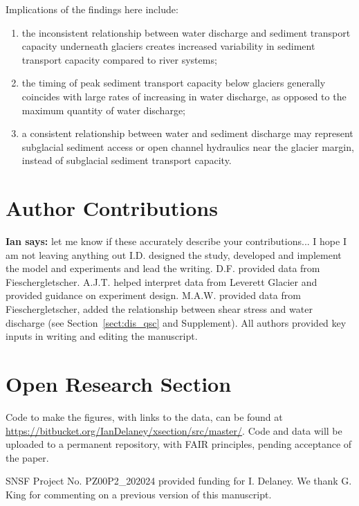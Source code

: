 \documentclass[draft]{agujournal2019}
\newcommand{\ian}[1]{{\textbf{\color{blue}Ian says:} \color{blue} #1} }
\begin{document}
Implications of the findings here include:
\begin{enumerate}
\item the inconsistent relationship between water discharge and sediment transport capacity underneath glaciers creates increased variability in sediment transport capacity compared to river systems;
\item the timing of peak sediment transport capacity below glaciers generally coincides with large rates of increasing in water discharge, as opposed to the maximum quantity of water discharge;
\item a consistent relationship between water and sediment discharge may represent subglacial sediment access or open channel hydraulics near the glacier margin, instead of subglacial sediment transport capacity.

\end{enumerate}

\section*{Author Contributions}
\ian{let me know if these accurately describe your contributions... I hope I am not leaving anything out}
I.D. designed the study, developed and implement the model and experiments and lead the writing.
D.F. provided data from Fieschergletscher.
A.J.T. helped interpret data from Leverett Glacier and provided guidance on experiment design.
M.A.W. provided data from Fieschergletscher, added the relationship between shear stress and water discharge (see Section~\ref{sect:dis_qsc} and Supplement).
All authors provided  key inputs in writing and editing the manuscript. 


\section*{Open Research Section}
Code to make the figures, with links to the data, can be found at \url{https://bitbucket.org/IanDelaney/xsection/src/master/}.
Code and data will be uploaded to a permanent repository, with FAIR principles, pending acceptance of the paper.

\acknowledgments

SNSF Project No. PZ00P2\_202024 provided  funding for I. Delaney.
We thank G. King for commenting on a previous version of this manuscript.






\appendix
\end{document}
